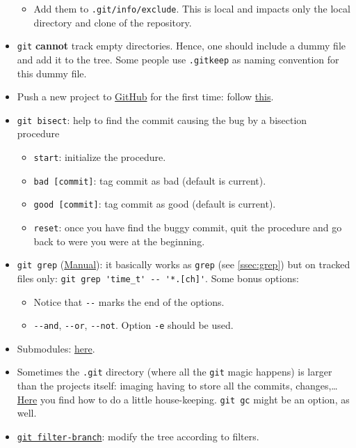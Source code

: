 \documentclass[a4paper,12pt,%
              final%
              ]{article}
\begin{document}
\begin{itemize}
\begin{itemize}
      \item Add them to \texttt{.git/info/exclude}. This is local and impacts only the local directory and clone of the repository.
    \end{itemize}
  \item \texttt{git} \textbf{cannot} track empty directories. Hence, one should include a dummy file and add it to the tree. Some people use \verb|.gitkeep| as naming convention for this dummy file.
  \item Push a new project to \href{https://github.com/}{GitHub} for the first time: follow \href{https://help.github.com/en/github/importing-your-projects-to-github/adding-an-existing-project-to-github-using-the-command-line}{this}.
  \item \texttt{git bisect}: help to find the commit causing the bug by a bisection procedure
    \begin{itemize}
      \item \verb|start|: initialize the procedure.
      \item \verb|bad [commit]|: tag commit as bad (default is current).
      \item \verb|good [commit]|: tag commit as good (default is current).
      \item \verb|reset|: once you have find the buggy commit, quit the procedure and go back to were you were at the beginning.
    \end{itemize}
  \item \verb|git grep| (\href{https://git-scm.com/docs/git-grep}{Manual}): it basically works as \verb|grep| (see \autoref{ssec:grep}) but on tracked files only: \verb|git grep 'time_t' -- '*.[ch]'|. Some bonus options:
    \begin{itemize}
      \item Notice that \verb|--| marks the end of the options.
      \item \verb|--and|, \verb|--or|, \verb|--not|. Option \verb|-e| should be used.
    \end{itemize}
  \item Submodules: \href{https://git-scm.com/book/en/v2/Git-Tools-Submodules}{here}.
  \item Sometimes the \texttt{.git} directory (where all the \texttt{git} magic happens) is larger than the projects itself: imaging having to store all the commits, changes,\ldots{} \href{https://stackoverflow.com/questions/5277467/how-can-i-clean-my-git-folder-cleaned-up-my-project-directory-but-git-is-sti}{Here} you find how to do a little house-keeping. \verb|git gc| might be an option, as well.
  \item \href{https://git-scm.com/docs/git-filter-branch}{\texttt{git filter-branch}}: modify the tree according to filters.

\end{itemize}
\end{document}

